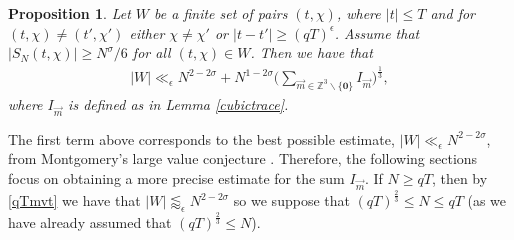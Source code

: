\documentclass[12pt]{amsart}
\newtheorem{proposition}[theorem]{Proposition}
\theoremstyle{definition}
\theoremstyle{plain}
\theoremstyle{remark}
\numberwithin{equation}{section}
\numberwithin{theorem}{section}
\numberwithin{equation}{section}
\begin{document}
	\begin{proposition}\label{W in terms of I}
		Let $W$ be a finite set of pairs $(t, \chi)$,  where $|t| \leq T$ and for $(t, \chi)\neq (t', \chi')$ either $\chi \neq \chi'$ or $|t-t'|\geq (qT)^{\epsilon}$. Assume that $|S_{N}(t, \chi)| \geq N^{\sigma}/6$ for all $(t, \chi)\in W$. Then we have that
		\begin{align*}
			|W| \ll_{\epsilon} N^{2-2 \sigma} + N^{1-2\sigma}\bigg(\sum_{\overrightarrow{m}\in \mathbb{Z}^{3} \backslash \{\mathbf{0}\}}I_{\overrightarrow{m}}\bigg)^{\frac{1}{3}},
		\end{align*}
		where $I_{\overrightarrow{m}}$ is defined as in Lemma \ref{cubictrace}.
	\end{proposition}
	The first term above corresponds to the best possible estimate, $|W| \ll_{\epsilon} N^{2-2\sigma}$, from Montgomery's large value conjecture \cite[Equation (4)]{HBLV}. Therefore, the following sections focus on obtaining a more precise estimate for the sum $I_{\overrightarrow{m}}$. If $N \geq qT$, then by \eqref{qTmvt} we have that $|W| \lessapprox_{\epsilon} N^{2-2\sigma}$ so we suppose that $(qT)^{\frac{2}{3}} \leq N \leq qT$ (as we have already assumed that $(qT)^{\frac{2}{3}} \leq N$).
	
\end{document}
